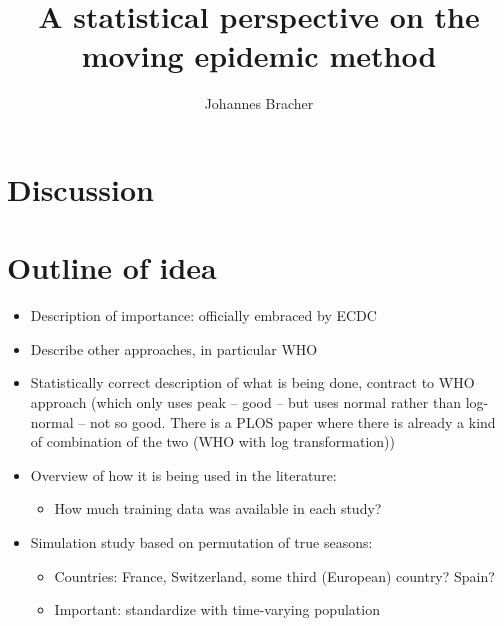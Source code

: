 \documentclass{article}
\begin{document}
\section{Discussion}
\label{sec:discussion}

\section*{Outline of idea}

\begin{itemize}
\item Description of importance: officially embraced by ECDC
\item Describe other approaches, in particular WHO
\item Statistically correct description of what is being done, contract to WHO approach (which only uses peak -- good -- but uses normal rather than log-normal -- not so good. There is a PLOS paper where there is already a kind of combination of the two (WHO with log transformation))
\item Overview of how it is being used in the literature:
\begin{itemize}
\item How much training data was available in each study?
\end{itemize}
\item Simulation study based on permutation of true seasons:
\begin{itemize}
\item Countries: France, Switzerland, some third (European) country? Spain?
\item Important: standardize with time-varying population
\end{itemize}
\end{itemize}

\title{A statistical perspective on the moving epidemic method }
\author{Johannes Bracher}
\maketitle





\end{document}
